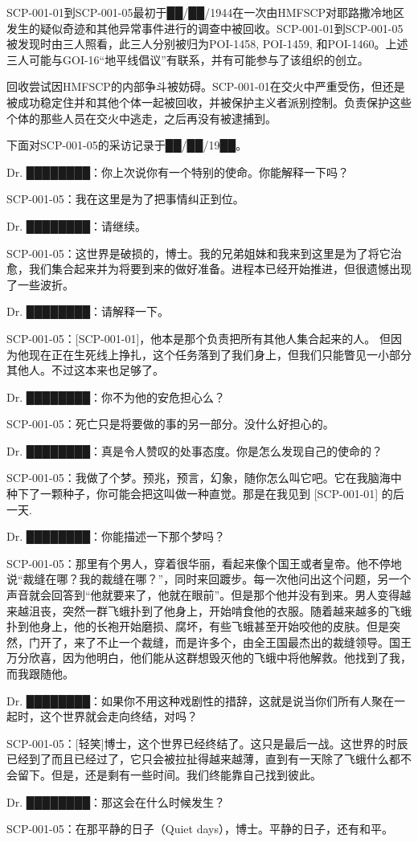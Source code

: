  SCP-001-01到SCP-001-05最初于██/██/1944在一次由HMFSCP对耶路撒冷地区发生的疑似奇迹和其他异常事件进行的调查中被回收。SCP-001-01到SCP-001-05被发现时由三人照看，此三人分别被归为POI-1458, POI-1459, 和POI-1460。上述三人可能与GOI-16“地平线倡议”有联系，并有可能参与了该组织的创立。

回收尝试因HMFSCP的内部争斗被妨碍。SCP-001-01在交火中严重受伤，但还是被成功稳定住并和其他个体一起被回收，并被保护主义者派别控制。负责保护这些个体的那些人员在交火中逃走，之后再没有被逮捕到。


下面对SCP-001-05的采访记录于██/██/19██。

\begin{scpbox}

Dr. ████████：你上次说你有一个特别的使命。你能解释一下吗？

SCP-001-05：我在这里是为了把事情纠正到位。

Dr. ████████：请继续。

SCP-001-05：这世界是破损的，博士。我的兄弟姐妹和我来到这里是为了将它治愈，我们集合起来并为将要到来的做好准备。进程本已经开始推进，但很遗憾出现了一些波折。

Dr. ████████：请解释一下。

SCP-001-05：[SCP-001-01]，他本是那个负责把所有其他人集合起来的人。 但因为他现在正在生死线上挣扎，这个任务落到了我们身上，但我们只能瞥见一小部分其他人。不过这本来也足够了。

Dr. ████████：你不为他的安危担心么？

SCP-001-05：死亡只是将要做的事的另一部分。没什么好担心的。

Dr. ████████：真是令人赞叹的处事态度。你是怎么发现自己的使命的？

SCP-001-05：我做了个梦。预兆，预言，幻象，随你怎么叫它吧。它在我脑海中种下了一颗种子，你可能会把这叫做一种直觉。那是在我见到 [SCP-001-01] 的后一天.

Dr. ████████：你能描述一下那个梦吗？

SCP-001-05：那里有个男人，穿着很华丽，看起来像个国王或者皇帝。他不停地说“裁缝在哪？我的裁缝在哪？”，同时来回踱步。每一次他问出这个问题，另一个声音就会回答到“他就要来了，他就在眼前”。但是那个他并没有到来。男人变得越来越沮丧，突然一群飞蛾扑到了他身上，开始啃食他的衣服。随着越来越多的飞蛾扑到他身上，他的长袍开始磨损、腐坏，有些飞蛾甚至开始咬他的皮肤。但是突然，门开了，来了不止一个裁缝，而是许多个，由全王国最杰出的裁缝领导。国王万分欣喜，因为他明白，他们能从这群想毁灭他的飞蛾中将他解救。他找到了我，而我跟随他。

Dr. ████████：如果你不用这种戏剧性的措辞，这就是说当你们所有人聚在一起时，这个世界就会走向终结，对吗？

SCP-001-05：[轻笑]博士，这个世界已经终结了。这只是最后一战。这世界的时辰已经到了而且已经过了，它只会被拉扯得越来越薄，直到有一天除了飞蛾什么都不会留下。但是，还是剩有一些时间。我们终能靠自己找到彼此。

Dr. ████████：那这会在什么时候发生？

SCP-001-05：在那平静的日子（Quiet days），博士。平静的日子，还有和平。

\end{scpbox}

